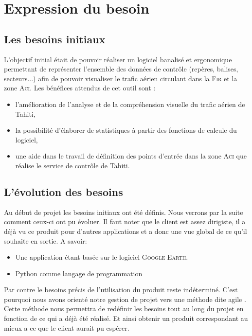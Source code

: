 
\section{Expression du besoin} 
    \subsection{Les besoins initiaux}
L’objectif initial était de pouvoir réaliser un logiciel banalisé et ergonomique permettant de
représenter l’ensemble des données de contrôle (repères, balises, secteurs...) afin de pouvoir
visualiser le trafic aérien circulant dans la \textsc{Fir} et la zone \textsc{Aci}.
Les bénéfices attendus de cet outil sont :
\begin{itemize}
\item l’amélioration de l’analyse et de la compréhension visuelle du trafic aérien de Tahiti,
\item la possibilité d’élaborer de statistiques à partir des fonctions de calcule du logiciel,
\item une aide dans le travail de définition des points d’entrée dans la zone \textsc{Aci} que réalise le
service de contrôle de Tahiti.
\end{itemize}\medskip

    \subsection{L’évolution des besoins}
Au début de projet les besoins initiaux ont été définis. Nous verrons par la suite comment ceux-ci ont pu évoluer. Il faut noter que le client est assez dirigiste, il a déjà vu ce produit pour d'autres applications et a donc une vue global de ce qu'il souhaite en sortie. A savoir:
\begin{itemize}
    \item Une application étant basée sur le logiciel \textsc{Google Earth}.
    \item Python comme langage de programmation
\end{itemize}\medskip
Par contre le besoins précis de l'utilisation du produit reste indéterminé. C'est pourquoi nous avons orienté notre gestion de projet vers une méthode dite agile . Cette méthode nous permettra de redéfinir les besoins tout au long du projet en fonction de ce qui a déjà été réalisé. Et ainsi obtenir un produit correspondant au mieux a ce que le client aurait pu espérer.

